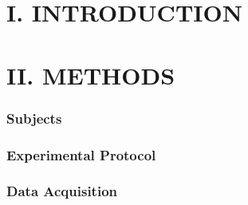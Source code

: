 \begin{multicols}{2}
	
	
%	
	
	\section*{I. INTRODUCTION}%
	
	
	
	
	
	\section*{II. METHODS}%
	
	\subsubsection*{Subjects}
	
	
	\subsubsection*{Experimental Protocol}
	
	
	\subsubsection*{Data Acquisition}
	
%	
	


\end{multicols}
